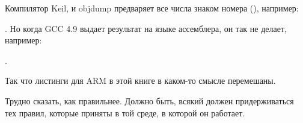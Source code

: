 ﻿


Компилятор Keil, \IDA и objdump предваряет все числа знаком номера (\q{\#}), например:

.
Но когда GCC 4.9 выдает результат на языке ассемблера, он так не делает, например:

.

Так что листинги для ARM в этой книге в каком-то смысле перемешаны.

Трудно сказать, как правильнее.
Должно быть, всякий должен придерживаться тех правил, которые приняты в той среде, в которой он работает.




